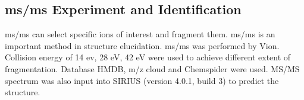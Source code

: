  
\subsection{\acrfull{ms/ms} Experiment and Identification}
\acrfull{ms/ms} can select specific ions of interest and fragment them. \acrshort{ms/ms} is an important method in structure elucidation. \acrshort{ms/ms} was performed by Vion. Collision energy of 14 ev, 28 eV, 42 eV were used to achieve different extent of fragmentation. Database HMDB, m/z cloud and Chemspider were used. MS/MS spectrum was also input into SIRIUS (version 4.0.1, build 3) to predict the structure.

    
